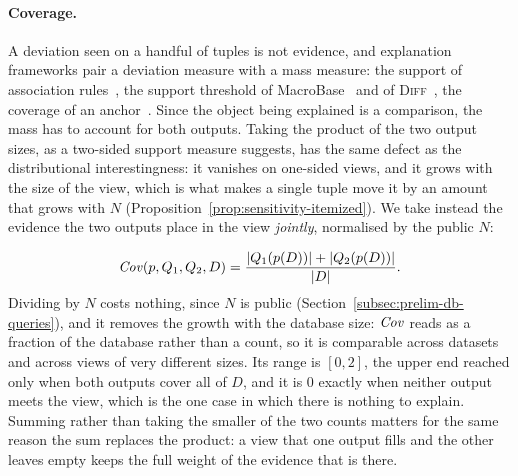 \paragraph{Coverage.}
A deviation seen on a handful of tuples is not evidence, and explanation frameworks pair a deviation measure with a mass measure: the support of association rules~\cite{AgrawalIS93}, the support threshold of MacroBase~\cite{MacroBase} and of \textsc{Diff}~\cite{DIFF}, the coverage of an anchor~\cite{Anchors}.
Since the object being explained is a comparison, the mass has to account for both outputs.
Taking the product of the two output sizes, as a two-sided support measure suggests, has the same defect as the distributional interestingness: it vanishes on one-sided views, and it grows with the size of the view, which is what makes a single tuple move it by an amount that grows with $N$ (Proposition~\ref{prop:sensitivity-itemized}).
We take instead the evidence the two outputs place in the view \emph{jointly}, normalised by the public $N$:

\begin{equation}
\mathit{Cov}(p,Q_1,Q_2,D)=\frac{|Q_1(p(D))|+|Q_2(p(D))|}{|D|}.
\label{eq:coverage-proxy}
\end{equation}
Dividing by $N$ costs nothing, since $N$ is public (Section~\ref{subsec:prelim-db-queries}), and it removes the growth with the database size: $\mathit{Cov}$ reads as a fraction of the database rather than a count, so it is comparable across datasets and across views of very different sizes.
Its range is $[0,2]$, the upper end reached only when both outputs cover all of $D$, and it is $0$ exactly when neither output meets the view, which is the one case in which there is nothing to explain.
Summing rather than taking the smaller of the two counts matters for the same reason the sum replaces the product: a view that one output fills and the other leaves empty keeps the full weight of the evidence that is there.

